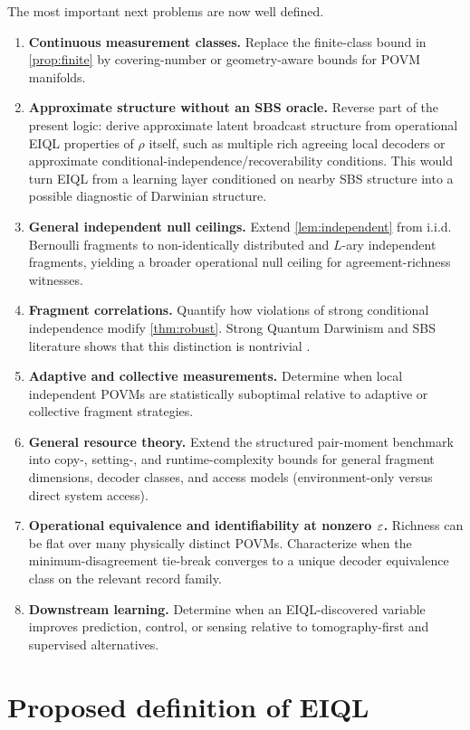 The most important next problems are now well defined.

\begin{enumerate}
\item \textbf{Continuous measurement classes.} Replace the finite-class bound in \cref{prop:finite} by covering-number or geometry-aware bounds for POVM manifolds.
\item \textbf{Approximate structure without an SBS oracle.} Reverse part of the present logic: derive approximate latent broadcast structure from operational EIQL properties of $\rho$ itself, such as multiple rich agreeing local decoders or approximate conditional-independence/recoverability conditions. This would turn EIQL from a learning layer conditioned on nearby SBS structure into a possible diagnostic of Darwinian structure.
\item \textbf{General independent null ceilings.} Extend \cref{lem:independent} from i.i.d. Bernoulli fragments to non-identically distributed and $L$-ary independent fragments, yielding a broader operational null ceiling for agreement-richness witnesses.
\item \textbf{Fragment correlations.} Quantify how violations of strong conditional independence modify \cref{thm:robust}. Strong Quantum Darwinism and SBS literature shows that this distinction is nontrivial \cite{le2019}.
\item \textbf{Adaptive and collective measurements.} Determine when local independent POVMs are statistically suboptimal relative to adaptive or collective fragment strategies.
\item \textbf{General resource theory.} Extend the structured pair-moment benchmark into copy-, setting-, and runtime-complexity bounds for general fragment dimensions, decoder classes, and access models (environment-only versus direct system access).
\item \textbf{Operational equivalence and identifiability at nonzero $\varepsilon$.} Richness can be flat over many physically distinct POVMs. Characterize when the minimum-disagreement tie-break converges to a unique decoder equivalence class on the relevant record family.
\item \textbf{Downstream learning.} Determine when an EIQL-discovered variable improves prediction, control, or sensing relative to tomography-first and supervised alternatives.
\end{enumerate}

\section{Proposed definition of EIQL}

